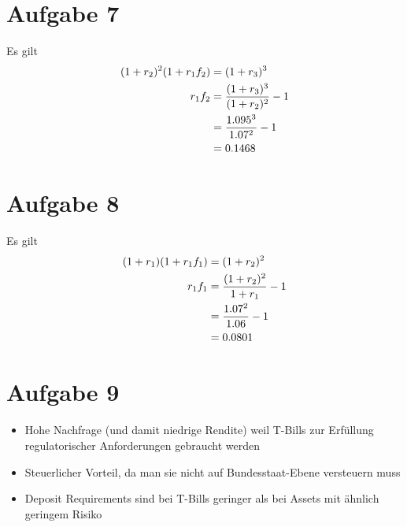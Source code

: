 \documentclass{article}
\begin{document}
	\section*{Aufgabe 7}
	Es gilt
	\begin{align}
		(1+r_2)^2(1+r_1f_2) &= (1+r_3)^3 \notag \\
		r_1f_2 &= \frac{(1+r_3)^3}{(1+r_2)^2}-1 \notag \\
		&= \frac{1.095^3}{1.07^2}-1 \notag \\
		&= 0.1468 \notag
	\end{align}
	
	\section*{Aufgabe 8}
	Es gilt
	\begin{align}
		(1+r_1)(1+r_1f_1) &= (1+r_2)^2 \notag \\
		r_1f_1 &= \frac{(1+r_2)^2}{1+r_1}-1 \notag \\
		&= \frac{1.07^2}{1.06}-1 \notag \\
		&= 0.0801 \notag
	\end{align}
	
	\section*{Aufgabe 9}
	\begin{itemize}
		\item Hohe Nachfrage (und damit niedrige Rendite) weil T-Bills zur Erfüllung regulatorischer Anforderungen gebraucht werden
		\item Steuerlicher Vorteil, da man sie nicht auf Bundesstaat-Ebene versteuern muss
		\item Deposit Requirements sind bei T-Bills geringer als bei Assets mit ähnlich geringem Risiko
	\end{itemize}
	
\end{document}
